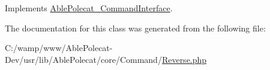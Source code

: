 Implements \hyperlink{interface_able_polecat___command_interface_a0f38ef3cd761210f2a667c669393498f}{Able\+Polecat\+\_\+\+Command\+Interface}.



The documentation for this class was generated from the following file\+:\begin{DoxyCompactItemize}
\item 
C\+:/wamp/www/\+Able\+Polecat-\/\+Dev/usr/lib/\+Able\+Polecat/core/\+Command/\hyperlink{_reverse_8php}{Reverse.\+php}\end{DoxyCompactItemize}
